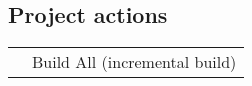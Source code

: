 \subsection{Project actions}
\begin{tabularx}{\linewidth}{@{}lX@{}}
	\keys{\ctrl + B}&		Build All (incremental build)\\
\end{tabularx}
